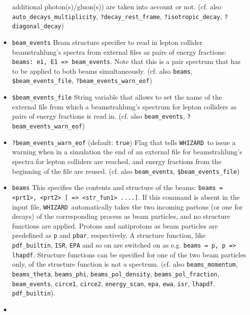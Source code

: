 \documentclass[12pt]{book}
\newcommand{\ttt}[1]{\texttt{#1}}
\newcommand{\whizard}{\texttt{WHIZARD}}
\begin{document}
\begin{itemize}
additional photon(s)/gluon(s)) are taken into account or
not. \newline (cf. also \ttt{auto\_decays\_multiplicity},
\ttt{?decay\_rest\_frame}, \ttt{?isotropic\_decay}, \newline
\ttt{?diagonal\_decay})  
\item
\ttt{beam\_events} \newline
Beam structure specifier to read in lepton collider beamstrahlung's
spectra from external files as pairs of energy fractions: \ttt{beams:
  e1, E1 => beam\_events}. Note that this is a pair spectrum that has to
be applied to both beams simultaneously. (cf. also \ttt{beams}, 
\ttt{\$beam\_events\_file}, \ttt{?beam\_events\_warn\_eof})
\item
\ttt{\$beam\_events\_file} \newline 
String variable that allows to set the name of the external file from
which a beamstrahlung's spectrum for lepton colliders as pairs of
energy fractions is read in. (cf. also \ttt{beam\_events},
\ttt{?beam\_events\_warn\_eof})
\item
\ttt{?beam\_events\_warn\_eof} \qquad (default: \ttt{true}) \newline
Flag that tells \whizard\ to issue a warning when in a simulation the
end of an external file for beamstrahlung's spectra for lepton
colliders are reached, and energy fractions from the beginning of the
file are reused. (cf. also \ttt{beam\_events},
\ttt{\$beam\_events\_file}) 
\item
\ttt{beams} \newline
This specifies the contents and structure of the beams: \ttt{beams =
  <prt1>, <prt2> [ => <str\_fun1> ....]}. If this
command is absent in the input file, \whizard\ automatically takes the
two incoming partons (or one for decays) of the corresponding process
as beam particles, and no structure functions are applied. Protons and
antiprotons as beam particles are predefined as \ttt{p} and
\ttt{pbar}, respectively. A structure function, like \ttt{pdf\_builtin},
\ttt{ISR}, \ttt{EPA} and so on are switched on as e.g. \ttt{beams = p,
p => lhapdf}. Structure functions can be specified for one of the two
beam particles only, of the structure function is not a
spectrum. (cf. also \ttt{beams\_momentum}, \ttt{beams\_theta}, 
\ttt{beams\_phi}, \ttt{beams\_pol\_density},
\ttt{beams\_pol\_fraction}, \ttt{beam\_events}, \ttt{circe1},
\ttt{circe2}, \ttt{energy\_scan}, \ttt{epa}, \ttt{ewa}, \ttt{isr},
\ttt{lhapdf}, \ttt{pdf\_builtin}). 
\item

\end{itemize}
\end{document}
